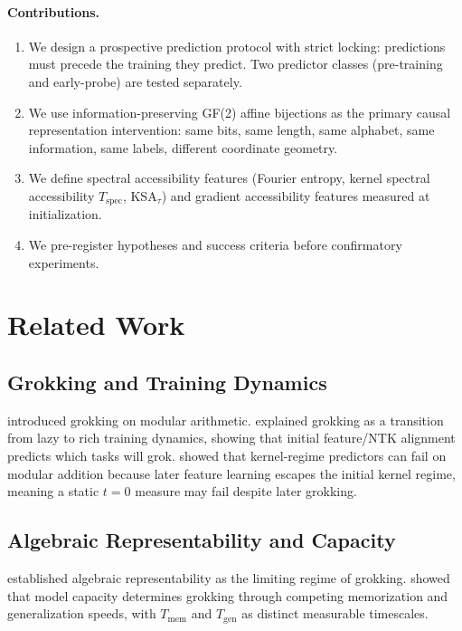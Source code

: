 \documentclass[11pt]{article}
\begin{document}
\paragraph{Contributions.}
\begin{enumerate}[leftmargin=*]
    \item We design a prospective prediction protocol with strict locking: predictions must precede the training they predict. Two predictor classes (pre-training and early-probe) are tested separately.
    \item We use information-preserving GF(2) affine bijections as the primary causal representation intervention: same bits, same length, same alphabet, same information, same labels, different coordinate geometry.
    \item We define spectral accessibility features (Fourier entropy, kernel spectral accessibility $T_{\text{spec}}$, KSA$_\tau$) and gradient accessibility features measured at initialization.
    \item We pre-register hypotheses and success criteria before confirmatory experiments.
\end{enumerate}

\section{Related Work}\label{sec:related}

\subsection{Grokking and Training Dynamics}

\citet{power2022grokking} introduced grokking on modular arithmetic. \citet{kumar2023grokking} explained grokking as a transition from lazy to rich training dynamics, showing that initial feature/NTK alignment predicts which tasks will grok. \citet{mohamadi2024grok} showed that kernel-regime predictors can fail on modular addition because later feature learning escapes the initial kernel regime, meaning a static $t=0$ measure may fail despite later grokking.

\subsection{Algebraic Representability and Capacity}

\citet{kam2026algebraic} established algebraic representability as the limiting regime of grokking. \citet{song2025capacity} showed that model capacity determines grokking through competing memorization and generalization speeds, with $T_{\text{mem}}$ and $T_{\text{gen}}$ as distinct measurable timescales.
\end{document}

